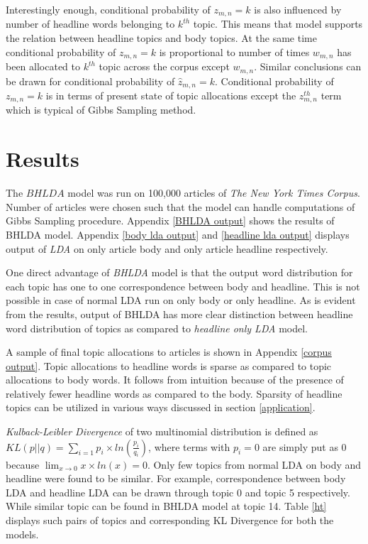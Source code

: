 \documentclass[a4paper]{article}
\begin{document}
Interestingly enough, conditional probability of $z_{m,n}=k$ is also influenced by number of headline words belonging to $k^{th}$ topic. This means that model supports the relation between headline topics and body topics. 
At the same time conditional probability of $z_{m,n}=k$ is proportional to number of times $w_{m,n}$ has been allocated to $k^{th}$ topic across the corpus except $w_{m,n}$. Similar conclusions can be drawn for conditional probability of  $\hat{z}_{m,n} = k$. Conditional probability of $z_{m,n} = k$ is in terms of present state of topic allocations except the $z_{m,n}^{th}$ term which is typical of Gibbs Sampling method. 

\section{Results}
The $BHLDA$ model was run on 100,000 articles of \emph{The New York Times Corpus}. Number of articles were chosen such that the model can handle computations of Gibbs Sampling procedure. Appendix \ref{BHLDA output} shows the results of BHLDA model. Appendix \ref{body lda output} and \ref{headline lda output} displays output of \emph{LDA} on only article body and only article headline respectively. 

One direct advantage of \emph{BHLDA} model is that the output word distribution for each topic has one to one correspondence between body and headline. This is not possible in case of normal LDA run on only body or only headline. As is evident from the results, output of BHLDA has more clear distinction between headline word distribution of topics as compared to \emph{headline only LDA} model. 

A sample of final topic allocations to articles is shown in Appendix \ref{corpus output}. Topic allocations to headline words is sparse as compared to topic allocations to body words. It follows from intuition because of the presence of relatively fewer headline words as compared to the body. Sparsity of headline topics can be utilized in various ways discussed in section \ref{application}.

\emph{Kulback-Leibler Divergence} of two multinomial distribution is defined as 
$KL(p||q) = \sum_{i=1} p_{i} \times ln(\frac{p_{i}}{q_{i}})$, where terms with $p_{i} = 0$ are simply put as 0 because $\lim_{x\to 0}x \times ln(x) = 0$. Only few topics from normal LDA on body and headline were found to be similar. For example, correspondence between body LDA and headline LDA can be drawn through topic 0 and topic 5 respectively. While similar topic can be found in BHLDA model at topic 14. Table \ref{ht} displays such pairs of topics and corresponding KL Divergence for both the models. 
\end{document}
